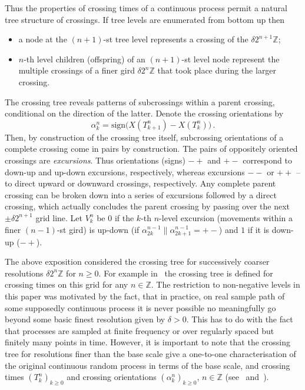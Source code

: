 Thus the properties of crossing times of a continuous process permit a natural tree
structure of crossings. If tree levels are enumerated from bottom up then \begin{itemize}
	\item a node at the $(n+1)$-st tree level represents a crossing of the $\delta 2^{n+1} \mathbb{Z}$;
	\item $n$-th level children (offspring) of an $(n+1)$-st level node represent the
	multiple crossings of a finer gird $\delta 2^n \mathbb{Z}$ that took place during
	the larger crossing. 
\end{itemize}

The crossing tree reveals patterns of subcrossings within a parent crossing, conditional
on the direction of the latter. Denote the crossing orientations by
\[ \alpha_k^n = \text{sign}\bigl( X(T_{k+1}^n) - X(T_k^n)\bigr)\,.\]
Then, by construction of the crossing tree itself, subcrossing orientations of a complete
crossing come in pairs by construction. The pairs of oppositely oriented crossings
are \emph{excursions}. Thus orientations (signs) $-+$ and $+-$ correspond to down-up
and up-down excursions, respectively, whereas excursions $--$ or $++$ -- to direct
upward or downward crossings, respectively. Any complete parent crossing can be broken
down into a series of excursions followed by a direct crossing, which actually concludes
the parent crossing by passing over the next $\pm\delta 2^{n+1}$ grid line. Let $V_k^n$
be $0$ if the $k$-th $n$-level excursion (movements within a finer $(n-1)$-st gird) is
up-down (if $\alpha_{2k}^{n-1}\|\alpha_{2k+1}^{n-1} = +-$) and $1$ if it is down-up ($-+$).

The above exposition considered the crossing tree for successively coarser resolutions
$\delta 2^n \mathbb{Z}$ for $n\geq0$. For example in~\cite{decrouez2013estimation} the
crossing tree is defined for crossing times on this grid for any $n\in\mathbb{Z}$.
The restriction to non-negative levels in this paper was motivated by the fact, that
in practice, on real sample path of some supposedly continuous process it is never
possible no meaningfully go beyond some basic finest resolution given by $\delta>0$.
This has to do with the fact that processes are sampled at finite frequency or over
regularly spaced but finitely many points in time. However, it is important to note
that the crossing tree for resolutions finer than the base scale give a one-to-one
characterisation of the original continuous random process in terms of the base scale,
and crossing times $(T_k^n)_{k\geq 0}$ and crossing orientations $(\alpha_k^n)_{k\geq 0}$,
$n\in \mathbb{Z}$ (see~\cite{decrouez2013estimation} and~\cite{ECP1673}).

